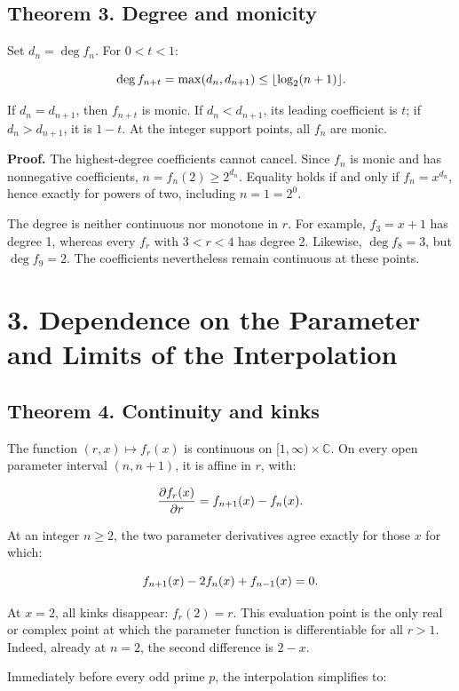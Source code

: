 \documentclass[11pt,a4paper]{article}
\newcommand{\fitmath}[1]{\begingroup\setbox0=\hbox{$\displaystyle #1$}\ifdim\wd0>\linewidth\resizebox{\linewidth}{!}{\box0}\else\box0\fi\endgroup}
\begin{document}
\subsection*{Theorem 3. Degree and monicity}

Set $d_n=\deg f_n$. For $0<t<1$:


\[
\fitmath{\deg f_{n+t}=\max(d_n,d_{n+1})\leq\lfloor\log_2(n+1)\rfloor.}
\]


If $d_n=d_{n+1}$, then $f_{n+t}$ is monic. If $d_n<d_{n+1}$, its leading coefficient is $t$; if $d_n>d_{n+1}$, it is $1-t$. At the integer support points, all $f_n$ are monic.


\textbf{Proof.} The highest-degree coefficients cannot cancel. Since $f_n$ is monic and has nonnegative coefficients, $n=f_n(2)\geq2^{d_n}$. Equality holds if and only if $f_n=x^{d_n}$, hence exactly for powers of two, including $n=1=2^0$.


The degree is neither continuous nor monotone in $r$. For example, $f_3=x+1$ has degree 1, whereas every $f_r$ with $3<r<4$ has degree 2. Likewise, $\deg f_8=3$, but $\deg f_9=2$. The coefficients nevertheless remain continuous at these points.


\section*{3. Dependence on the Parameter and Limits of the Interpolation}

\subsection*{Theorem 4. Continuity and kinks}

The function $(r,x)\mapsto f_r(x)$ is continuous on $[1,\infty)\times\mathbb C$. On every open parameter interval $(n,n+1)$, it is affine in $r$, with:


\[
\fitmath{\frac{\partial f_r(x)}{\partial r}=f_{n+1}(x)-f_n(x).}
\]


At an integer $n\geq2$, the two parameter derivatives agree exactly for those $x$ for which:


\[
\fitmath{f_{n+1}(x)-2f_n(x)+f_{n-1}(x)=0.}
\]


At $x=2$, all kinks disappear: $f_r(2)=r$. This evaluation point is the only real or complex point at which the parameter function is differentiable for all $r>1$. Indeed, already at $n=2$, the second difference is $2-x$.


Immediately before every odd prime $p$, the interpolation simplifies to:
\end{document}
